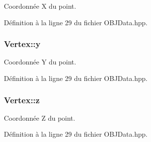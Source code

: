 Coordonnée X du point. 



Définition à la ligne 29 du fichier O\+B\+J\+Data.\+hpp.

\hypertarget{structVertex_a094de867ef3e32b21c234cd1ebe42d61}{
\subsubsection[{y}]{\setlength{\rightskip}{0pt plus 5cm}Vertex\+::y}}\label{structVertex_a094de867ef3e32b21c234cd1ebe42d61}


Coordonnée Y du point. 



Définition à la ligne 29 du fichier O\+B\+J\+Data.\+hpp.

\hypertarget{structVertex_aada56d7a3ea4da97fc44b07b9cdf49b0}{
\subsubsection[{z}]{\setlength{\rightskip}{0pt plus 5cm}Vertex\+::z}}\label{structVertex_aada56d7a3ea4da97fc44b07b9cdf49b0}


Coordonnée Z du point. 



Définition à la ligne 29 du fichier O\+B\+J\+Data.\+hpp.

